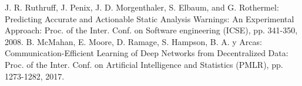 \documentclass[uplatex,dvipdfmx,a4paper,twocolumn,base=11pt,jbase=11pt,ja=standard]{bxjsarticle}  %
\begin{document}
\begin{thebibliography}{1}
     J. R. Ruthruff, J. Penix, J. D. Morgenthaler, S. Elbaum, and G. Rothermel: Predicting Accurate and Actionable Static Analysis Warnings: An Experimental Approach: Proc. of the Inter. Conf. on Software engineering (ICSE), pp. 341-350, 2008.
     B. McMahan, E. Moore, D. Ramage, S. Hampson, B. A. y Arcas: Communication-Efficient Learning of Deep Networks from Decentralized Data: Proc. of the Inter. Conf. on Artificial Intelligence and Statistics (PMLR), pp. 1273-1282, 2017.
\end{thebibliography}





%
\end{document}
